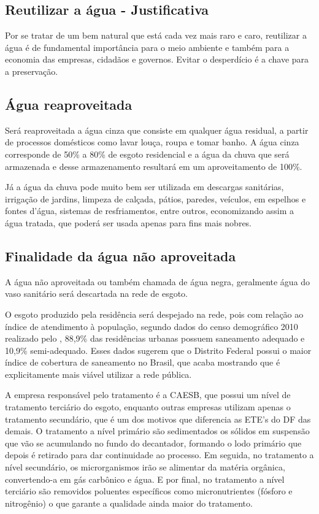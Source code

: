 \subsection{Reutilizar a água - Justificativa}

	Por se tratar de um bem natural que está cada vez mais raro e caro, reutilizar a água é de fundamental importância para o meio ambiente e também para a economia das empresas, cidadãos e governos. Evitar o desperdício é a chave para a preservação.

\subsection{Água reaproveitada}

	Será reaproveitada a água cinza que consiste em qualquer água residual, a partir de processos domésticos como lavar louça, roupa e tomar banho. A água cinza corresponde de 50\% a 80\% de esgoto residencial e a água da chuva que será armazenada e desse armazenamento resultará em um aproveitamento de 100\%.

	Já a água da chuva pode muito bem ser utilizada em descargas sanitárias, irrigação de jardins, limpeza de calçada, pátios, paredes, veículos, em espelhos e fontes d’água, sistemas de resfriamentos, entre outros, economizando assim a água tratada, que poderá ser usada apenas para fins mais nobres.

\subsection{Finalidade da água não aproveitada}

	A água não aproveitada ou também chamada de água negra, geralmente água do vaso sanitário será descartada na rede de esgoto.

	O esgoto produzido pela residência será despejado na rede, pois com relação ao índice de atendimento à população, segundo dados do censo demográfico 2010 realizado pelo \cite{IBGE}, 88,9\% das residências urbanas possuem saneamento adequado e 10,9\% semi-adequado. Esses dados sugerem que o Distrito Federal possui o maior índice de cobertura de saneamento no Brasil, que acaba mostrando que é explicitamente mais viável utilizar a rede pública.

	A empresa responsável pelo tratamento é a CAESB, que possui um nível de tratamento terciário do esgoto, enquanto outras empresas utilizam apenas o tratamento secundário, que é um dos motivos que diferencia as ETE's do DF das demais. O tratamento a nível primário são sedimentados os sólidos em suspensão que vão se acumulando no fundo do decantador, formando o lodo primário que depois é retirado para dar continuidade ao processo. Em seguida, no tratamento a nível secundário, os microrganismos irão se alimentar da matéria orgânica, convertendo-a em gás carbônico e água. E por final, no tratamento a nível terciário são removidos poluentes específicos como micronutrientes (fósforo e nitrogênio) o que garante a qualidade ainda maior do tratamento.

